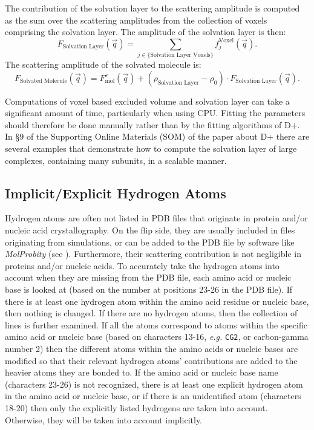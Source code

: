 \documentclass[../D+Manual.tex]{subfiles}
\begin{document}
The contribution of the solvation layer to the scattering amplitude is computed as the sum over the scattering amplitudes from the collection of voxels comprising the solvation layer. 
The amplitude of the solvation layer is then:
\begin{equation}
F_\text{Solvation Layer}\left(\vec{q}\right) = \sum_{j\in\{\text{Solvation Layer Voxels}\}} f_j^{\text{Voxel}}\left(\vec{q}\right).
\label{solvation}
\end{equation}
The scattering amplitude of the solvated molecule is:
\begin{equation}
F_\text{Solvated Molecule}\left(\vec{q}\right) = F^s_{\text{mol}}\left(\vec{q}\right) + \left(\rho_{\text{Solvation Layer}}-\rho_{0}\right) \cdot F_\text{Solvation Layer}\left(\vec{q}\right).
\label{eq:SolvatedMolecule}
\end{equation} 
 



Computations of voxel based excluded volume and solvation layer can take a significant amount of time, particularly when using CPU. Fitting the parameters should therefore be done manually rather than by the fitting algorithms of D+. In \S9 %
of the Supporting Online Materials (SOM) of the paper about D+ \cite{Dplus2017} there are several examples that demonstrate how to compute the solvation layer of large complexes, containing many subunits, in a scalable manner. 

\subsection{Implicit/Explicit Hydrogen Atoms}
\label{sec:implicitExplicit}

Hydrogen atoms are often not listed in PDB files that originate in protein and/or nucleic acid crystallography.
On the flip side, they are usually included in files originating from simulations, or can be added to the PDB file by software like \textit{MolProbity} (see \cite{ChenDz5180}).
Furthermore, their scattering contribution is not negligible in proteins and/or nucleic acids.
To accurately take the hydrogen atoms into account when they are missing from the PDB file, each amino acid or nucleic base is looked at (based on the number at positions 23-26 in the PDB file).
If there is at least one hydrogen atom within the amino acid residue or nucleic  base, then nothing is changed.
If there are no hydrogen atoms, then the collection of lines is further examined.
If all the atoms correspond to atoms within the specific amino acid or nucleic base (based on characters 13-16, \textit{e.g.} \texttt{CG2}, or carbon-gamma number 2) then the different atoms within the amino acids or nucleic bases are modified so that their relevant hydrogen atoms' contributions are added to the heavier atoms they are bonded to.
If the amino acid or nucleic base name (characters 23-26) is not recognized, there is at least one explicit hydrogen atom in the amino acid or nucleic base, or if there is an unidentified atom (characters 18-20) then only the explicitly listed hydrogens are taken into account.
Otherwise, they will be taken into account implicitly.
\end{document}
